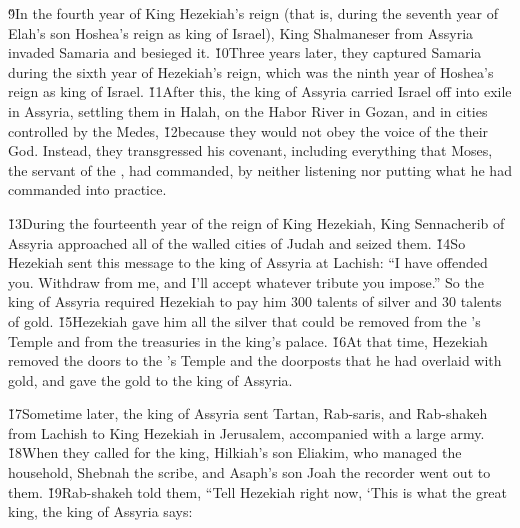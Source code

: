 \v{9}In the fourth year of King Hezekiah's reign (that is, during the seventh year of Elah's son Hoshea's reign as king of Israel), King Shalmaneser from Assyria invaded Samaria and besieged it. \v{10}Three years later, they captured Samaria during the sixth year of Hezekiah's reign, which was the ninth year of Hoshea's reign as king of Israel. \v{11}After this, the king of Assyria carried Israel off into exile in Assyria, settling them in Halah, on the Habor River in Gozan, and in cities controlled by the Medes, \v{12}because they would not obey the voice of the  their God. Instead, they transgressed his covenant, including everything that Moses, the servant of the , had commanded, by neither listening nor putting what he had commanded into practice.

\v{13}During the fourteenth year of the reign of King Hezekiah, King Sennacherib of Assyria approached all of the walled cities of Judah and seized them. \v{14}So Hezekiah sent this message to the king of Assyria at Lachish: ``I have offended you. Withdraw from me, and I'll accept whatever tribute you impose.'' So the king of Assyria required Hezekiah to pay him 300 talents of silver and 30 talents of gold. \v{15}Hezekiah gave him all the silver that could be removed from the 's Temple and from the treasuries in the king's palace. \v{16}At that time, Hezekiah removed the doors to the 's Temple and the doorposts that he had overlaid with gold, and gave the gold to the king of Assyria.

\v{17}Sometime later, the king of Assyria sent Tartan, Rab-saris, and Rab-shakeh from Lachish to King Hezekiah in Jerusalem, accompanied with a large army. \v{18}When they called for the king, Hilkiah's son Eliakim, who managed the household, Shebnah the scribe, and Asaph's son Joah the recorder went out to them. \v{19}Rab-shakeh told them, ``Tell Hezekiah right now, `This is what the great king, the king of Assyria says:

